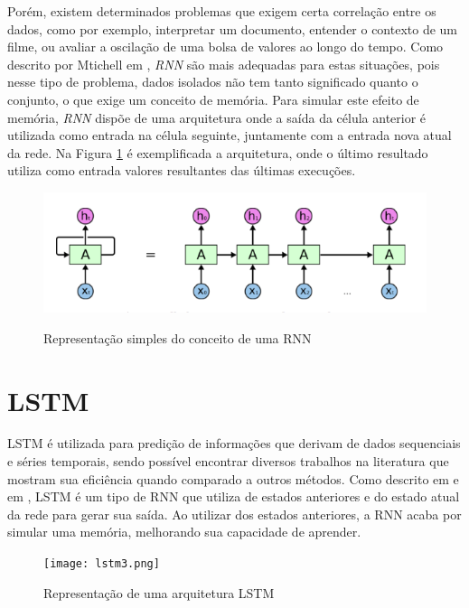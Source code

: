 Porém, existem determinados problemas que exigem certa correlação entre os dados, como por exemplo, interpretar um documento, entender o contexto de um filme, ou avaliar a oscilação de uma bolsa de valores ao longo do tempo. Como descrito por Mtichell em \cite{mitchell1997}, \textit{\acrshort{RNN}} são mais adequadas para estas situações, pois nesse tipo de problema, dados isolados não tem tanto significado quanto o conjunto, o que exige um conceito de memória. Para simular este efeito de memória, \textit{\acrshort{RNN}} dispõe de uma arquitetura onde a saída da célula anterior é utilizada como entrada na célula seguinte, juntamente com a entrada nova atual da rede. Na Figura \ref{figure:rnn} é exemplificada a arquitetura, onde o último resultado utiliza como entrada valores resultantes das últimas execuções.

\begin{figure}[htb]
    \centering
    \includegraphics[scale=0.4]{rnnExample.png}
    \label{figure:rnn}
    \caption[Representação simples do conceito de um RNN]{Representação simples do conceito de uma RNN \footnotemark}
\end{figure}

\section{\acrfull{LSTM}}

\acrshort{LSTM} é utilizada para predição de informações que derivam de dados sequenciais e séries temporais, sendo possível encontrar diversos trabalhos na literatura que mostram sua eficiência quando comparado a outros métodos. Como descrito em \cite{Zainab_2018} e em \cite{Xiaolei_2015}, \acrshort{LSTM} é um tipo de \acrshort{RNN} que utiliza de estados anteriores e do estado atual da rede para gerar sua saída. Ao utilizar dos estados anteriores, a \acrshort{RNN} acaba por simular uma memória, melhorando sua capacidade de aprender. 

\begin{figure}[htb]
    \centering
    \texttt{[image: lstm3.png]}
    \label{figure:eixo}
    \caption[Representação de uma arquitetura LSTM]{Representação de uma arquitetura LSTM\footnotemark}
\end{figure}

